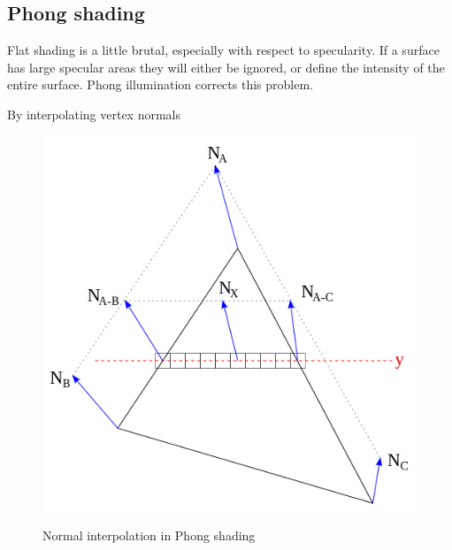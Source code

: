 \subsection{Phong shading}
Flat shading is a little brutal, especially with respect to specularity. If a
surface has large specular areas they will either be ignored, or define the
intensity of the entire surface. Phong illumination corrects this problem.

By interpolating vertex  normals
\begin{figure}
\includegraphics{pics/phongInterpol.png}
\label{fig:phongInterpo}
\caption{Normal interpolation in Phong shading}
\end{figure}
